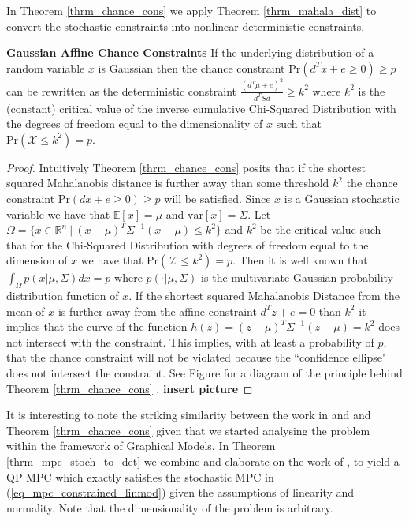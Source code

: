In Theorem \ref{thrm_chance_cons} we apply Theorem \ref{thrm_mahala_dist} to convert the stochastic constraints into nonlinear deterministic constraints.
\begin{thrm}
\textbf{Gaussian Affine Chance Constraints} If the underlying distribution of a random variable $x$ is Gaussian then the chance constraint $\text{Pr}(d^Tx + e \geq 0) \geq p$ can be rewritten as the deterministic constraint $\frac{(d^T\mu+e)^2}{d^TSd} \geq k^2$ where $k^2$ is the (constant) critical value of the inverse cumulative Chi-Squared Distribution with the degrees of freedom equal to the dimensionality of $x$ such that $\text{Pr}(\mathcal{X} \leq k^2) = p$. 
\label{thrm_chance_cons}
\end{thrm}
\begin{proof}
Intuitively Theorem \ref{thrm_chance_cons} posits that if the shortest squared Mahalanobis distance is further away than some threshold $k^2$ the chance constraint $\text{Pr}(dx + e \geq 0) \geq p$ will be satisfied. Since $x$ is a Gaussian stochastic variable we have that $\mathbb{E}[x] =\mu$ and $\text{var}[x]=\Sigma$. Let $\Omega = \{x \in \mathbb{R}^n~|~(x-\mu)^T\Sigma^{-1}(x-\mu) \leq k^2\}$ and $k^2$ be the critical value such that for the Chi-Squared Distribution with degrees of freedom equal to the dimension of $x$ we have that $\text{Pr}(\mathcal{X} \leq k^2) = p$. Then it is well known \cite{mahala2} that $\int_{\Omega}p(x|\mu, \Sigma)dx = p$ where $p(\cdot|\mu, \Sigma)$ is the multivariate Gaussian probability distribution function of $x$. If the shortest squared Mahalanobis Distance from the mean of $x$ is further away from the affine constraint $d^Tz+e=0$ than $k^2$ it implies that the curve of the function $h(z) = (z-\mu)^T\Sigma^{-1}(z-\mu) = k^2$ does not intersect with the constraint. This implies, with at least a probability of $p$, that the chance constraint will not be violated because the ``confidence ellipse" does not intersect the constraint. See Figure for a diagram of the principle behind Theorem \ref{thrm_chance_cons} \cite{mahala1}. \textbf{insert picture}
\end{proof}
It is interesting to note the striking similarity between the work in \cite{vanhessem1} and \cite{vanhessem2} and Theorem \ref{thrm_chance_cons} given that we started analysing the problem within the framework of Graphical Models. In Theorem \ref{thrm_mpc_stoch_to_det} we combine and elaborate on the work of \cite{yan1}, \cite{vanhessem1} to yield a QP MPC which exactly satisfies the stochastic MPC in (\ref{eq_mpc_constrained_linmod}) given the assumptions of linearity and normality. Note that the dimensionality of the problem is arbitrary.
